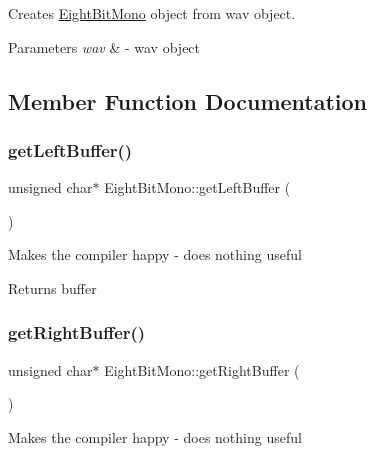 Creates \hyperlink{classEightBitMono}{Eight\+Bit\+Mono} object from wav object.


\begin{DoxyParams}{Parameters}
{\em wav} & -\/ wav object \\
\hline
\end{DoxyParams}


\subsection{Member Function Documentation}
\mbox{\label{classEightBitMono_a70e3b0ee28587aee861ac1c68c7a7546}} 
\subsubsection{\texorpdfstring{get\+Left\+Buffer()}{getLeftBuffer()}}
{\footnotesize\ttfamily unsigned char$\ast$ Eight\+Bit\+Mono\+::get\+Left\+Buffer (\begin{DoxyParamCaption}{ }\end{DoxyParamCaption})\hspace{0.3cm}{\ttfamily [inline]}}

Makes the compiler happy -\/ does nothing useful

\begin{DoxyReturn}{Returns}
buffer 
\end{DoxyReturn}
\mbox{\label{classEightBitMono_ae04b3f0e68a021cd8466b564c30c2e57}} 
\subsubsection{\texorpdfstring{get\+Right\+Buffer()}{getRightBuffer()}}
{\footnotesize\ttfamily unsigned char$\ast$ Eight\+Bit\+Mono\+::get\+Right\+Buffer (\begin{DoxyParamCaption}{ }\end{DoxyParamCaption})\hspace{0.3cm}{\ttfamily [inline]}}

Makes the compiler happy -\/ does nothing useful

